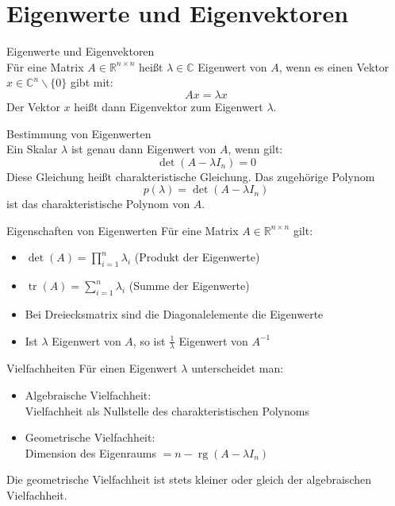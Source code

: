 \columnbreak


\section{Eigenwerte und Eigenvektoren}

\begin{definition}{Eigenwerte und Eigenvektoren}\\
Für eine Matrix $A \in \mathbb{R}^{n\times n}$ heißt $\lambda \in \mathbb{C}$ Eigenwert von $A$, wenn es einen Vektor $x \in \mathbb{C}^n \backslash \{0\}$ gibt mit:
\vspace{-2mm}\\
$$Ax = \lambda x$$
Der Vektor $x$ heißt dann Eigenvektor zum Eigenwert $\lambda$.
\end{definition}

\begin{concept}{Bestimmung von Eigenwerten}\\
Ein Skalar $\lambda$ ist genau dann Eigenwert von $A$, wenn gilt:
\vspace{-2mm}\\
$$\det(A - \lambda I_n) = 0$$
Diese Gleichung heißt charakteristische Gleichung. Das zugehörige Polynom
\vspace{-2mm}
$$p(\lambda) = \det(A - \lambda I_n)$$
ist das charakteristische Polynom von $A$.
\end{concept}

\begin{theorem}{Eigenschaften von Eigenwerten}
Für eine Matrix $A \in \mathbb{R}^{n\times n}$ gilt:
\begin{itemize}
    \item $\det(A) = \prod_{i=1}^n \lambda_i$ (Produkt der Eigenwerte)
    \item $\operatorname{tr}(A) = \sum_{i=1}^n \lambda_i$ (Summe der Eigenwerte)
    \item Bei Dreiecksmatrix sind die Diagonalelemente die Eigenwerte
    \item Ist $\lambda$ Eigenwert von $A$, so ist $\frac{1}{\lambda}$ Eigenwert von $A^{-1}$
\end{itemize}
\end{theorem}

\begin{concept}{Vielfachheiten}
Für einen Eigenwert $\lambda$ unterscheidet man:
\begin{itemize}
    \item Algebraische Vielfachheit: \\Vielfachheit als Nullstelle des charakteristischen Polynoms
    \item Geometrische Vielfachheit: \\Dimension des Eigenraums $= n - \operatorname{rg}(A-\lambda I_n)$
\end{itemize}
Die geometrische Vielfachheit ist stets kleiner oder gleich der algebraischen Vielfachheit.
\end{concept}

